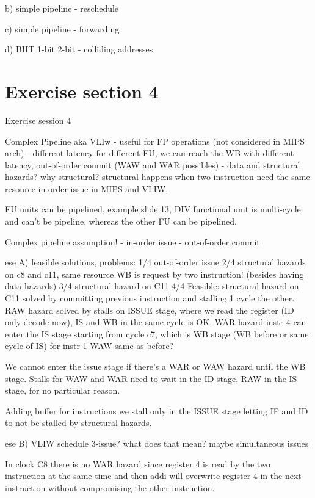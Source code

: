 b) simple pipeline
- reschedule

c) simple pipeline
- forwarding

d) BHT 1-bit 2-bit
- colliding addresses


\section{Exercise section 4}\label{sec:exercise-section-4}

Exercise session 4

Complex Pipeline aka VLIw
- useful for FP operations (not considered in MIPS arch)
- different latency for different FU, we can reach the WB with different latency, out-of-order commit (WAW and WAR possibles)
- data and structural hazards? why structural? structural happens when two instruction need the same resource
in-order-issue in MIPS and VLIW,

FU units can be pipelined, example slide 13, DIV functional unit is multi-cycle and can't be pipeline, whereas the other
FU can be pipelined.

Complex pipeline assumption!
- in-order issue
- out-of-order commit

ese A) feasible solutions, problems:
1/4 out-of-order issue
2/4 structural hazards on c8 and c11, same resource WB is request by two instruction! (besides having data hazards)
3/4 structural hazard on C11
4/4 Feasible:
structural hazard on C11 solved by committing previous instruction and stalling 1 cycle the other.
RAW hazard solved by stalls on ISSUE stage, where we read the register (ID only decode now), IS and WB in the same cycle is OK\@.
WAR hazard instr 4 can enter the IS stage starting from cycle c7, which is WB stage (WB before or same cycle of IS) for instr 1
WAW same as before?

We cannot enter the issue stage if there's a WAR or WAW hazard until the WB stage.
Stalls for WAW and WAR need to wait in the ID stage, RAW in the IS stage, for no particular reason.

Adding buffer for instructions we stall only in the ISSUE stage letting IF and ID to not be stalled by structural hazards.

ese B) VLIW schedule
3-issue? what does that mean? maybe simultaneous issues

In clock C8 there is no WAR hazard since register 4 is read by the two instruction at the same time and then addi will overwrite
register 4  in the next instruction without compromising the other instruction.

